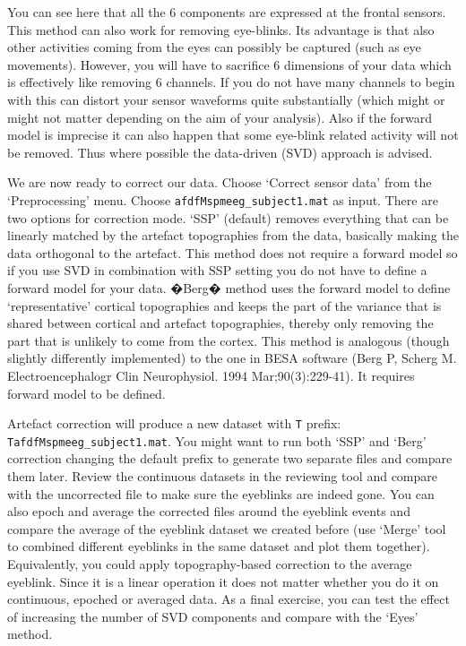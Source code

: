 You can see here that all the 6 components are expressed at the frontal sensors. This method can also work for removing eye-blinks. Its advantage is that also other activities coming from the eyes can possibly be captured (such as eye movements). However, you will have to sacrifice 6 dimensions of your data which is effectively like removing 6 channels. If you do not have many channels to begin with this can distort your sensor waveforms quite substantially (which might or might not matter depending on the aim of your analysis). Also if the forward model is imprecise it can also happen that some eye-blink related activity will not be removed. Thus where possible the data-driven (SVD) approach is advised.

We are now ready to correct our data. Choose `Correct sensor data' from the `Preprocessing' menu. Choose \texttt{afdfMspmeeg\_subject1.mat} as input. There are two options for correction mode. `SSP' (default) removes everything that can be linearly matched by the artefact topographies from the data, basically making the data orthogonal to the artefact. This method does not require a forward model so if you use SVD in combination with SSP setting you do not have to define a forward model for your data. �Berg� method uses the forward model to define `representative' cortical topographies and keeps the part of the variance that is shared between cortical and artefact topographies, thereby only removing the part that is unlikely to come from the cortex. This method is analogous (though slightly differently implemented) to the one in BESA software (Berg P, Scherg M. Electroencephalogr Clin Neurophysiol. 1994 Mar;90(3):229-41). It requires forward model to be defined.

Artefact correction will produce a new dataset with \texttt{T} prefix: \texttt{TafdfMspmeeg\_subject1.mat}. You might want to run both `SSP' and `Berg' correction changing the default prefix to generate two separate files and compare them later. Review the continuous datasets in the reviewing tool and compare with the uncorrected file to make sure the eyeblinks are indeed gone. You can also epoch and average the corrected files around the eyeblink events and compare the average of the eyeblink dataset we created before (use `Merge' tool to combined different eyeblinks in the same dataset and plot them together). Equivalently, you could apply topography-based correction to the average eyeblink. Since it is a linear operation it does not matter whether you do it on continuous, epoched or averaged data. As a final exercise, you can test the effect of increasing the number of SVD components and compare with the `Eyes' method. 


